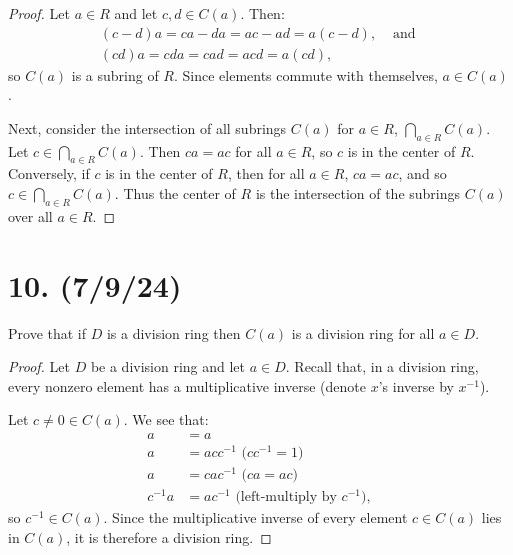 \documentclass{article}
\begin{document}
\begin{proof}
    Let $a \in R$ and let $c, d \in C(a)$. Then:
    \begin{align*}
        (c - d)a = ca - da = ac - ad = a(c - d),& \text{ and } \\
        (cd)a = cda = cad = acd = a(cd),&
    \end{align*}
    so $C(a)$ is a subring of $R$. Since elements commute with themselves, $a \in C(a)$.

    Next, consider the intersection of all subrings $C(a)$ for $a \in R$, $\bigcap_{a \in R} C(a)$. Let $c \in \bigcap_{a \in R} C(a)$. Then $ca = ac$ for all $a \in R$, so $c$ is in the center of $R$. Conversely, if $c$ is in the center of $R$, then for all $a \in R$, $ca = ac$, and so $c \in \bigcap_{a \in R} C(a)$. Thus the center of $R$ is the intersection of the subrings $C(a)$ over all $a \in R$.
\end{proof}

\section*{10. (7/9/24)}

Prove that if $D$ is a division ring then $C(a)$ is a division ring for all $a \in D$.

\begin{proof}
    Let $D$ be a division ring and let $a \in D$. Recall that, in a division ring, every nonzero element has a multiplicative inverse (denote $x$'s inverse by $x^{-1}$).

    Let $c \neq 0 \in C(a)$. We see that:
    \begin{align*}
        a &= a \\
        a &= a c c^{-1} \text{ ($cc^{-1} = 1$)}\\
        a &= c a c^{-1} \text{ ($ca = ac$)}\\
        c^{-1} a &= a c^{-1} \text{ (left-multiply by $c^{-1}$)},
    \end{align*}
    so $c^{-1} \in C(a)$. Since the multiplicative inverse of every element $c \in C(a)$ lies in $C(a)$, it is therefore a division ring.
\end{proof}
\end{document}
